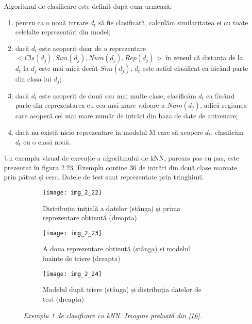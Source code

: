 Algoritmul de clasificare este definit după cum urmează:
\begin{enumerate}
	\item pentru ca o nouă intrare $d_t$ să fie clasificată, calculăm similaritatea ei cu toate celelalte reprezentări din model;
	\item dacă $d_t$ este acoperit doar de o reprezentare $<Cls(d_j), Sim(d_j), Num(d_j), Rep(d_j)>$ în sensul că distanța de la $d_t$ la $d_j$ este mai mică decât $Sim(d_j)$, $d_t$ este astfel clasificat ca făcând parte din clasa lui $d_j$;
	\item dacă $d_t$ este acoperit de două sau mai multe clase, clasificăm $d_t$ ca făcând parte din reprezentarea cu cea mai mare valoare a $Num(d_j)$, adică regiunea care acoperă cel mai mare număr de intrări din baza de date de antrenare;
	\item dacă nu există nicio reprezentare în modelul M care să acopere $d_t$, clasificăm $d_t$ cu o clasă nouă.
\end{enumerate}

Un exemplu vizual de execuție a algoritmului de kNN, parcurs pas cu pas, este prezentat în figura 2.23. Exemplu conține 36 de intrări din două clase marcate prin pătrat și cerc. Datele de test sunt reprezentate prin tringhiuri.
\begin{figure}[!h]
  \centering
  \begin{subfigure}[b]{0.49\textwidth}
    \texttt{[image: img\_2\_22]}
    \caption{Distribuția inițială a datelor (stânga) și prima reprezentare obținută (dreapta)}
    \label{fig:f1}
  \end{subfigure}
  \hfill
  \begin{subfigure}[b]{0.49\textwidth}
    \texttt{[image: img\_2\_23]}
    \caption{A doua reprezentare obținută (stânga) și modelul înainte de triere (dreapta)}
    \label{fig:f2}
  \end{subfigure}
  \hfill
  \begin{subfigure}[b]{0.49\textwidth}
    \texttt{[image: img\_2\_24]}
    \caption{Modelul după triere (stânga) și distribuția datelor de test (dreapta)}
    \label{fig:f3}
  \end{subfigure}
  \caption[Exemplu 1 de clasificare cu kNN]{\textit{Exemplu 1 de clasificare cu kNN. Imagine preluată din \hyperlink{gongdeguo}{[16]}.}}
\end{figure}  

